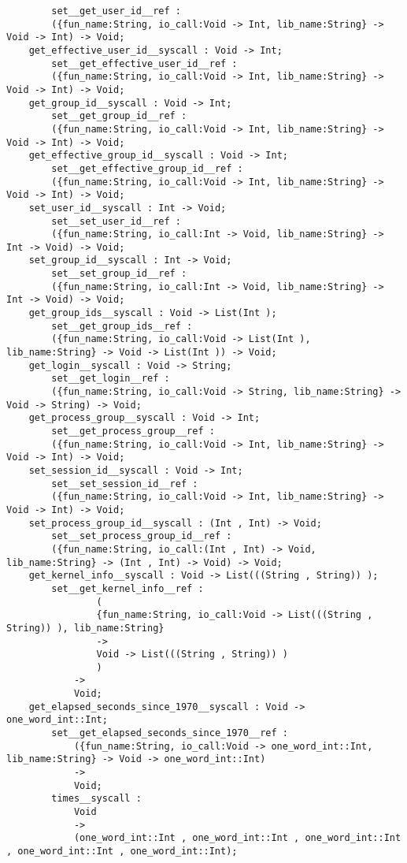 \begin{verbatim}
        set__get_user_id__ref :
        ({fun_name:String, io_call:Void -> Int, lib_name:String} -> Void -> Int) -> Void;
    get_effective_user_id__syscall : Void -> Int;
        set__get_effective_user_id__ref :
        ({fun_name:String, io_call:Void -> Int, lib_name:String} -> Void -> Int) -> Void;
    get_group_id__syscall : Void -> Int;
        set__get_group_id__ref :
        ({fun_name:String, io_call:Void -> Int, lib_name:String} -> Void -> Int) -> Void;
    get_effective_group_id__syscall : Void -> Int;
        set__get_effective_group_id__ref :
        ({fun_name:String, io_call:Void -> Int, lib_name:String} -> Void -> Int) -> Void;
    set_user_id__syscall : Int -> Void;
        set__set_user_id__ref :
        ({fun_name:String, io_call:Int -> Void, lib_name:String} -> Int -> Void) -> Void;
    set_group_id__syscall : Int -> Void;
        set__set_group_id__ref :
        ({fun_name:String, io_call:Int -> Void, lib_name:String} -> Int -> Void) -> Void;
    get_group_ids__syscall : Void -> List(Int );
        set__get_group_ids__ref :
        ({fun_name:String, io_call:Void -> List(Int ), lib_name:String} -> Void -> List(Int )) -> Void;
    get_login__syscall : Void -> String;
        set__get_login__ref :
        ({fun_name:String, io_call:Void -> String, lib_name:String} -> Void -> String) -> Void;
    get_process_group__syscall : Void -> Int;
        set__get_process_group__ref :
        ({fun_name:String, io_call:Void -> Int, lib_name:String} -> Void -> Int) -> Void;
    set_session_id__syscall : Void -> Int;
        set__set_session_id__ref :
        ({fun_name:String, io_call:Void -> Int, lib_name:String} -> Void -> Int) -> Void;
    set_process_group_id__syscall : (Int , Int) -> Void;
        set__set_process_group_id__ref :
        ({fun_name:String, io_call:(Int , Int) -> Void, lib_name:String} -> (Int , Int) -> Void) -> Void;
    get_kernel_info__syscall : Void -> List(((String , String)) );
        set__get_kernel_info__ref :
                (
                {fun_name:String, io_call:Void -> List(((String , String)) ), lib_name:String}
                ->
                Void -> List(((String , String)) )
                )
            ->
            Void;
    get_elapsed_seconds_since_1970__syscall : Void -> one_word_int::Int;
        set__get_elapsed_seconds_since_1970__ref :
            ({fun_name:String, io_call:Void -> one_word_int::Int, lib_name:String} -> Void -> one_word_int::Int)
            ->
            Void;
        times__syscall :
            Void
            ->
            (one_word_int::Int , one_word_int::Int , one_word_int::Int , one_word_int::Int , one_word_int::Int);

\end{verbatim}
